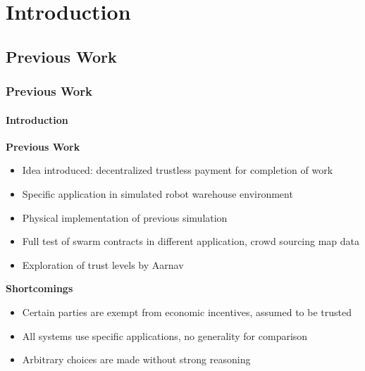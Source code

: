 \documentclass[
	10pt, %
	aspectratio=169, %
]{beamer}
\begin{document}
\section{Introduction}
\frame{\sectionpage}

\subsection{Previous Work}
\begin{frame}
	\frametitle{Previous Work}
	\framesubtitle{Introduction}

	{
		\large \bf
		Previous Work
	}
	\begin{itemize}
		\item Idea introduced: decentralized trustless payment for completion of work \cite{grey2020orig}
		\item Specific application in simulated robot warehouse environment \cite{grey2021warehouseSim}
		\item Physical implementation of previous simulation \cite{mallikarachchi2022warehouseReal}
		\item Full test of swarm contracts in different application, crowd sourcing map data \cite{mallikarachchi2023maps}
		\item Exploration of trust levels by Aarnav
	\end{itemize}

	\medskip

	{
		\large \bf
		Shortcomings
	}
	\begin{itemize}
		\item Certain parties are exempt from economic incentives, assumed to be trusted
		\item All systems use specific applications, no generality for comparison
		\item Arbitrary choices are made without strong reasoning
	\end{itemize}
\end{frame}
\end{document}
